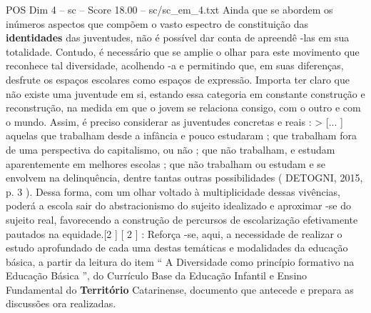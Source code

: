 \begin{textsample}{POS Dim 4 – sc – Score 18.00 – sc/sc\_em\_4.txt}
Ainda que se abordem os inúmeros aspectos que compõem o vasto espectro de constituição das \textbf{identidades} das juventudes, não é possível dar conta de apreendê -las em sua totalidade.
Contudo, é necessário que se amplie o olhar para este movimento que reconhece tal diversidade, acolhendo -a e permitindo que, em suas diferenças, desfrute os espaços escolares como espaços de expressão.
Importa ter claro que não existe uma juventude em si, estando essa categoria em constante construção e reconstrução, na medida em que o jovem se relaciona consigo, com o outro e com o mundo.
Assim, é preciso considerar as juventudes concretas e reais : > [... ] aquelas que trabalham desde a infância e pouco estudaram ; que trabalham fora de uma perspectiva do capitalismo, ou não ; que não trabalham, e estudam aparentemente em melhores escolas ; que não trabalham ou estudam e se envolvem na delinquência, dentre tantas outras possibilidades ( DETOGNI, 2015, p. 3 ).
Dessa forma, com um olhar voltado à multiplicidade dessas vivências, poderá a escola sair do abstracionismo do sujeito idealizado e aproximar -se do sujeito real, favorecendo a construção de percursos de escolarização efetivamente pautados na equidade.[2 ] [ 2 ] : Reforça -se, aqui, a necessidade de realizar o estudo aprofundado de cada uma destas temáticas e modalidades da educação básica, a partir da leitura do item “ A Diversidade como princípio formativo na Educação Básica ”, do Currículo Base da Educação Infantil e Ensino Fundamental do \textbf{Território} Catarinense, documento que antecede e prepara as discussões ora realizadas.

\end{textsample}
